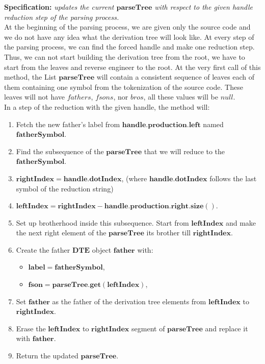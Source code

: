 \textbf{Specification:} \textit{updates the current \(\boldsymbol{parseTree}\) with respect to the given handle reduction step of the parsing process.}\\

At the beginning of the parsing process, we are given only the source code and we do not have any idea what the derivation tree will look like. At every step of the parsing process, we can find the forced handle and make one reduction step. Thus, we can not start building the derivation tree from the root, we have to start from the leaves and reverse engineer to the root. At the very first call of this method, the List \(\boldsymbol{parseTree}\) will contain a consistent sequence of leaves each of them containing one symbol from the tokenization of the source code. These leaves will not have \(fathers\), \(fsons\), nor \(bros\), all these values will be \(null\).\\

In a step of the reduction with the given handle, the method will:
\begin{enumerate}
    \item Fetch the new father’s label from \(\boldsymbol{handle.production.left}\) named \(\boldsymbol{fatherSymbol}\).
    \item Find the subsequence of the \(\boldsymbol{parseTree}\) that we will reduce to the \(\boldsymbol{fatherSymbol}\).
    \item \(\boldsymbol{rightIndex = handle.dotIndex}\), (where \(\boldsymbol{handle.dotIndex}\) follows the last symbol of the reduction string)
    \item \(\boldsymbol{leftIndex = rightIndex - handle.production.right.size()}\).
    \item Set up brotherhood inside this subsequence. Start from \(\boldsymbol{leftIndex}\) and make the next right element of the \(\boldsymbol{parseTree}\) its brother till \(\boldsymbol{rightIndex}\).
    \item Create the father \(\boldsymbol{DTE}\) object \(\boldsymbol{father}\) with:
    \begin{itemize}
        \item \(\boldsymbol{label = fatherSymbol}\),
        \item \(\boldsymbol{fson = parseTree.get(leftIndex)}\),
    \end{itemize}
    \item Set \(\boldsymbol{father}\) as the father of the derivation tree elements from \(\boldsymbol{leftIndex}\) to \(\boldsymbol{rightIndex}\).
    \item Erase the \(\boldsymbol{leftIndex}\) to \(\boldsymbol{rightIndex}\) segment of \(\boldsymbol{parseTree}\) and replace it with \(\boldsymbol{father}\).
    \item Return the updated \(\boldsymbol{parseTree}\).
\end{enumerate}

